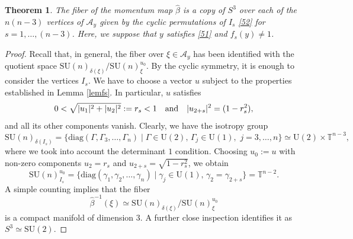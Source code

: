 \documentclass[a4paper,11pt,reqno]{amsart}
\newtheorem{thm}{Theorem}[section]
\theoremstyle{definition}
\numberwithin{equation}{section}
\newcommand{\be}{\begin{equation}}
\newcommand{\ee}{\end{equation}}
\def\cA{{\mathcal A}}                       %
\def\bT{{\mathbb T}}                        %
\def\diag{\mathrm{diag}}                    %
\def\SU{\mathrm{SU}}                        %
\def\U{\mathrm{U}}                          %
\begin{document}
\begin{thm}\label{thm54}
The fiber of the momentum map $\hat \beta$ is a copy of $S^3$ over each of the $n(n-3)$
vertices of $\cA_y$  given by the cyclic permutations of $I_s$ \eqref{52} for $s=1,\dots, (n-3)$.
Here, we suppose that $y$ satisfies \eqref{51} and $f_s(y) \neq 1$.
\end{thm}
\begin{proof}
Recall that, in general, the fiber over $\xi\in \cA_y$ has been identified with the quotient space $\SU(n)_{\delta(\xi)}/\SU(n)_{\xi}^{u_0}$.
By the cyclic symmetry, it is enough to consider the vertices $I_s$.
We have to choose a vector $u$ subject to the properties established in Lemma \ref{lemfs}.
In particular, $u$ satisfies
\be
0<  \sqrt{\vert u_1\vert^2 + \vert u_2 \vert^2} := r_s < 1
\quad \hbox{and}\quad \vert u_{2+s}\vert^2 = (1-r_s^2),
\label{512}\ee
and all its other components vanish.
Clearly,   we have the isotropy group
\be
\SU(n)_{\delta(I_s)} = \{\diag(\Gamma, \Gamma_3, \dots, \Gamma_n) \mid \Gamma \in \U(2),\,
\Gamma_j \in \U(1),\,\,j=3,\dots, n\} \simeq \U(2) \times \bT^{n-3},
\label{513}\ee
where we took into account  the determinant $1$ condition.
 Choosing $u_0:=u$ with non-zero components $u_2 = r_s$ and
$u_{2+s} = \sqrt{1-r_s^2}$, we  obtain
\be
\SU(n)_{I_s}^{u_0} = \{\diag(\gamma_1, \gamma_2,\dots, \gamma_n)\mid \gamma_j \in \U(1),\,  \gamma_2 = \gamma_{2+s}\} = \bT^{n-2}.
\label{514}\ee
A simple counting implies that the fiber
\be
\hat \beta^{-1}(\xi) \simeq \SU(n)_{\delta(\xi)}/\SU(n)_\xi^{u_0}
\label{515}\ee
is a compact manifold of dimension $3$. A further close inspection identifies it as $S^3 \simeq \SU(2)$.


\end{proof}
\end{document}
